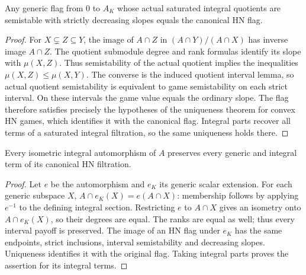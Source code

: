 \begin{lemma}
\label{lem:hermitian-hn-unique}
\leanok
Any generic flag from $0$ to $A_K$ whose actual saturated integral
quotients are semistable with strictly decreasing slopes equals the
canonical HN flag.
\end{lemma}
\begin{proof}
For $X\subsetneq Z\subseteq Y$, the image of $A\cap Z$ in
$(A\cap Y)/(A\cap X)$ has inverse image $A\cap Z$. The quotient
submodule degree and rank formulas identify its slope with $\mu(X,Z)$.
Thus semistability of the actual quotient implies the inequalities
$\mu(X,Z)\leq\mu(X,Y)$. The converse is the induced quotient interval
lemma, so actual quotient semistability is equivalent to game
semistability on each strict interval. On these intervals the game
value equals the ordinary slope. The flag therefore satisfies precisely
the hypotheses of the uniqueness theorem for convex HN games, which
identifies it with the canonical flag. Integral parts recover all terms
of a saturated integral filtration, so the same uniqueness holds there.
\end{proof}

\begin{lemma}
\label{lem:hermitian-hn-isometry}
\leanok
Every isometric integral automorphism of $A$ preserves every generic and
integral term of its canonical HN filtration.
\end{lemma}
\begin{proof}
Let $e$ be the automorphism and $e_K$ its generic scalar extension.
For each generic subspace $X$,
$A\cap e_K(X)=e(A\cap X)$: membership follows by applying $e^{-1}$
to the defining integral section. Restricting $e$ to $A\cap X$ gives
an isometry onto $A\cap e_K(X)$, so their degrees are equal.
The ranks are equal as well; thus every interval payoff is preserved.
The image of an HN flag under $e_K$ has the same endpoints, strict
inclusions, interval semistability and decreasing slopes. Uniqueness
identifies it with the original flag. Taking integral parts proves the
assertion for its integral terms.
\end{proof}

